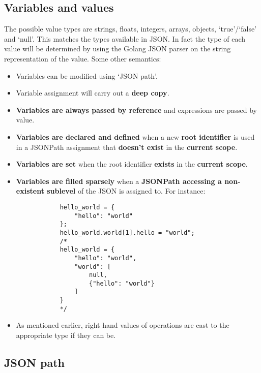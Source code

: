 \subsection{Variables and values}

The possible value types are strings, floats, integers, arrays, objects, `true'/`false' and `null'. This matches the types available in JSON. In fact the type of each value will be determined by using the Golang JSON parser on the string representation of the value. Some other semantics:

\begin{center}
    \begin{itemize}
        \item Variables can be modified using `JSON path'.
        \item Variable assignment will carry out a \textbf{deep copy}.
        \item \textbf{Variables are always passed by reference} and expressions are passed by value.
        \item \textbf{Variables are declared and defined} when a new \textbf{root identifier} is used in a JSONPath assignment that \textbf{doesn't exist} in the \textbf{current scope}.
        \item \textbf{Variables are set} when the root identifier \textbf{exists} in the \textbf{current scope}.
        \item \textbf{Variables are filled sparsely} when a \textbf{JSONPath accessing a non-existent sublevel} of the JSON is assigned to. For instance:
        \begin{verbatim}
            hello_world = {
                "hello": "world"
            };
            hello_world.world[1].hello = "world";
            /*
            hello_world = {
                "hello": "world",
                "world": [
                    null,
                    {"hello": "world"}
                ]
            }
            */
        \end{verbatim}
        \item As mentioned earlier, right hand values of operations are cast to the appropriate type if they can be. 
    \end{itemize}
\end{center}

\subsection{JSON path}

